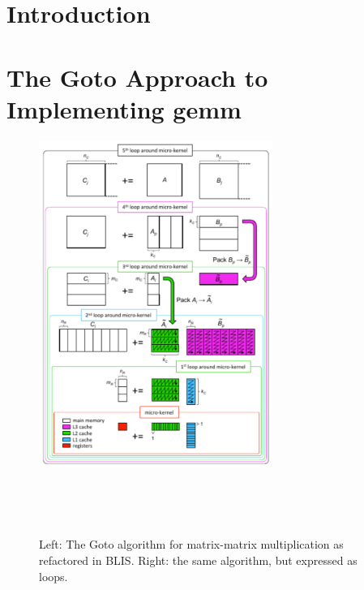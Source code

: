 \section{Introduction}
\label{sec:introduction}



\section{The Goto Approach to Implementing {\sc gemm}}
\label{sec:BLIS}

\begin{figure}[tb!]
\begin{center}
\begin{minipage}{3in}
\mbox{\includegraphics[width=3.0in]{mm_blis_color.pdf}}
\end{minipage}
~~~
\begin{minipage}[t]{3in}
\footnotesize  
\mbox{  }
\end{minipage}
\end{center}
\caption{Left: The Goto algorithm for matrix-matrix multiplication as  
  refactored in BLIS.  Right: the same algorithm, but expressed as  
  loops.}
\label{fig:blis_gemm}
\end{figure}

\cite{Goto:2008:AHP}
\cite{BLIS1}
\cite{BLIS2}
\cite{BLIS3}
\cite{BLIS4}



